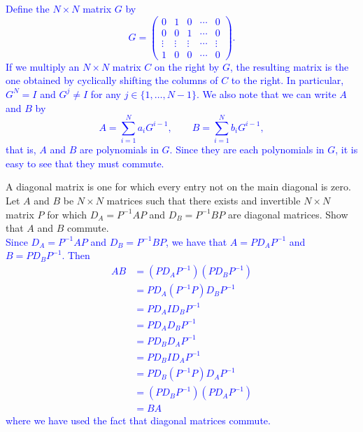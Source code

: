 \documentclass[a4paper,11pt]{article}
\newcommand{\BB}[1]{\textcolor{blue}{#1}}
\begin{document}
\BB{Define the $N \times N$ matrix $G$ by
  \[
    G=\begin{pmatrix}
        0 & 1 & 0 & \cdots & 0 \\
        0 & 0 & 1 & \cdots & 0 \\
        \vdots & \vdots & \vdots & \cdots & \vdots \\
        1 & 0 & 0 & \cdots & 0
      \end{pmatrix}.
  \]
  If we multiply an $N \times N$ matrix $C$ on the right by $G$, the resulting
  matrix is the one obtained by cyclically shifting the columns of $C$ to the
  right. In particular, $G^N=I$ and $G^j \neq I$ for any $j \in
  \{1,\dots,N-1\}$. We also note that we can write $A$ and $B$ by
  \[
    A = \sum_{i=1}^Na_iG^{i-1}, \qquad B = \sum_{i=1}^Nb_iG^{i-1},
  \]
  that is, $A$ and $B$ are polynomials in $G$. Since they are each polynomials
  in $G$, it is easy to see that they must commute. \\}

 A diagonal matrix is one for which every entry
not on the main diagonal is zero. Let $A$ and $B$ be $N \times N$ matrices such
that there exists and invertible $N \times N$ matrix $P$ for which
$D_A=P^{-1}AP$ and $D_B=P^{-1}BP$ are diagonal matrices. Show that $A$ and $B$
commute. \\

\BB{Since $D_A=P^{-1}AP$ and $D_B=P^{-1}BP$, we have that $A=PD_AP^{-1}$ and
  $B=PD_BP^{-1}$. Then
  \begin{align*}
    AB &= (PD_AP^{-1})(PD_BP^{-1}) \\
       &= PD_A(P^{-1}P)D_BP^{-1} \\
       &= PD_AID_BP^{-1} \\
       &= PD_AD_BP^{-1} \\
       &= PD_BD_AP^{-1} \\
       &= PD_BID_AP^{-1} \\
       &= PD_B(P^{-1}P)D_AP^{-1} \\
       &= (PD_BP^{-1})(PD_AP^{-1}) \\
       &= BA
  \end{align*}
  where we have used the fact that diagonal matrices commute.
}
\end{document}
